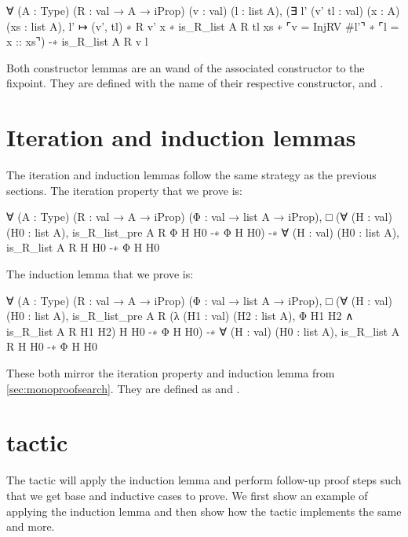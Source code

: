 \documentclass[thesis.tex]{subfiles}
\begin{document}
{\begin{coqcode}
  ∀ (A : Type) (R : val → A → iProp) 
    (v : val) (l : list A),
       (∃ l' (v' tl : val) (x : A) (xs : list A), 
          l' ↦ (v', tl) ∗ R v' x ∗ is_R_list A R tl xs ∗ 
          ⌜v = InjRV #l'⌝ ∗ ⌜l = x :: xs⌝) 
    -∗ is_R_list A R v l
\end{coqcode}
Both constructor lemmas are an wand of the associated constructor to the fixpoint. They are defined with the name of their respective constructor,  and .

\section{Iteration and induction lemmas}\label{sec:constriterind}
The iteration and induction lemmas follow the same strategy as the previous sections. The iteration property that we prove is:
\begin{coqcode}
  ∀ (A : Type) (R : val → A → iProp) 
    (Φ : val → list A → iProp),
    □ (∀ (H : val) (H0 : list A), 
         is_R_list_pre A R Φ H H0 -∗ Φ H H0) -∗
    ∀ (H : val) (H0 : list A), 
      is_R_list A R H H0 -∗ Φ H H0
\end{coqcode}
The induction lemma that we prove is:
\begin{coqcode}
  ∀ (A : Type) (R : val → A → iProp) 
    (Φ : val → list A → iProp),
    □ (∀ (H : val) (H0 : list A),
        is_R_list_pre A R
          (λ (H1 : val) (H2 : list A), 
             Φ H1 H2 ∧ is_R_list A R H1 H2) H
          H0 -∗ Φ H H0) -∗
    ∀ (H : val) (H0 : list A), 
      is_R_list A R H H0 -∗ Φ H H0
\end{coqcode}
These both mirror the iteration property and induction lemma from \cref{sec:monoproofsearch}. They are defined as  and .

\section{ tactic}\label{sec:inductiontactic}
The  tactic will apply the induction lemma and perform follow-up proof steps such that we get base and inductive cases to prove. We first show an example of applying the induction lemma and then show how the  tactic implements the same and more.

}
\end{document}
